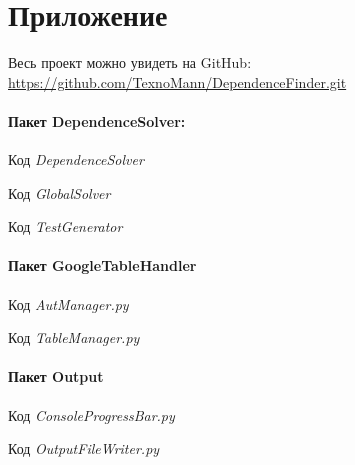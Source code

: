 \newpage
\section*{Приложение}

Весь проект можно увидеть на GitHub:\\
\url{https://github.com/TexnoMann/DependenceFinder.git}

\paragraph{Пакет DependenceSolver:\\
}
Код \textit{DependenceSolver}


Код \textit{GlobalSolver}


Код \textit{TestGenerator}


    
\newpage
\paragraph{Пакет GoogleTableHandler\\
}
Код \textit{AutManager.py}


Код \textit{TableManager.py}



\newpage
\paragraph{Пакет Output\\
}
Код \textit{ConsoleProgressBar.py}


Код \textit{OutputFileWriter.py}
